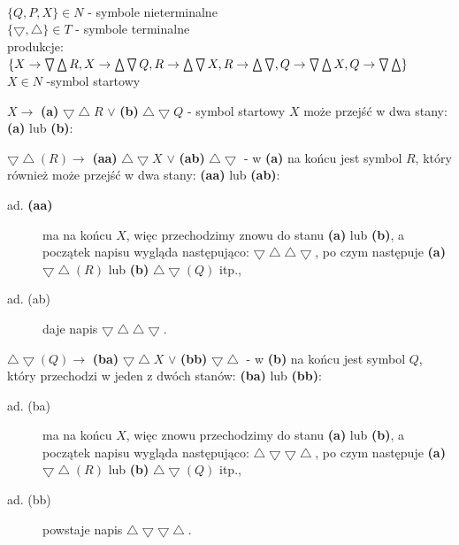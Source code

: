 {\\$\{Q, P, X\} \in N$ - symbole nieterminalne\\
	$\{\bigtriangledown, \bigtriangleup\} \in T$ - symbole terminalne\\
	produkcje: $\{X \to \bigtriangledown \bigtriangleup R,\\ 
	X \to \bigtriangleup \bigtriangledown Q,\\
	R \to \bigtriangleup \bigtriangledown X,\\
	R \to \bigtriangleup \bigtriangledown,\\
	Q \to \bigtriangledown \bigtriangleup X,\\
	Q \to \bigtriangledown \bigtriangleup\}$\\
	$X \in N$ -symbol startowy

	\begin{description}
		\item $X \to$ \textbf{(a)} $\bigtriangledown \bigtriangleup R$ $\vee$ \textbf{(b)} $\bigtriangleup \bigtriangledown Q$ - symbol startowy $X$ może przejść w dwa stany: \textbf{(a)} lub \textbf{(b)}:
		\item[ad. (a)] $\bigtriangledown \bigtriangleup (R) \to$ \textbf{(aa)} $\bigtriangleup \bigtriangledown X$ $\vee$ \textbf{(ab)} $\bigtriangleup \bigtriangledown$ - w \textbf{(a)} na końcu jest symbol $R$, który również może przejść w dwa stany: \textbf{(aa)} lub \textbf{(ab)}:
		\begin{description}
			\item[ad. \textbf{(aa)}] ma na końcu $X$, więc przechodzimy znowu do stanu \textbf{(a)} lub \textbf{(b)}, a początek napisu wygląda następująco: $\bigtriangledown \bigtriangleup \bigtriangleup \bigtriangledown$, po czym następuje \textbf{(a)} $\bigtriangledown \bigtriangleup (R)$ lub \textbf{(b)} $\bigtriangleup \bigtriangledown (Q)$ itp.,
			\item[ad. (ab)] daje napis $\bigtriangledown \bigtriangleup \bigtriangleup \bigtriangledown$.
		\end{description}
		\item[ad. (b)] $\bigtriangleup \bigtriangledown (Q) \to$ \textbf{(ba)} $\bigtriangledown \bigtriangleup X$ $\vee$ \textbf{(bb)} $\bigtriangledown \bigtriangleup$ - w \textbf{(b)} na końcu jest symbol $Q$, który przechodzi w jeden z dwóch stanów: \textbf{(ba)} lub \textbf{(bb)}:
		\begin{description}
			\item[ad. (ba)] ma na końcu $X$, więc znowu przechodzimy do stanu \textbf{(a)} lub \textbf{(b)}, a początek napisu wygląda następująco: $\bigtriangleup \bigtriangledown \bigtriangledown \bigtriangleup$, po czym następuje \textbf{(a)} $\bigtriangledown \bigtriangleup (R)$ lub \textbf{(b)} $\bigtriangleup \bigtriangledown (Q)$ itp.,
			\item[ad. (bb)] powstaje napis $\bigtriangleup \bigtriangledown \bigtriangledown \bigtriangleup$.
		\end{description}
	\end{description}
	}
	
